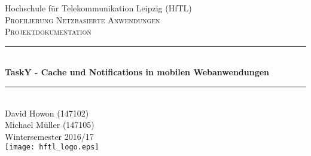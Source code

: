 \begin{titlepage}

\newcommand{\HRule}{\rule{\linewidth}{0.5mm}} %

\center %
 

\LARGE Hochschule für Telekommunikation Leipzig (HfTL)\\[1.2cm] %
\textsc{\Large Profilierung Netzbasierte Anwendungen}\\[0.5cm] %
\textsc{\large Projektdokumentation}\\[0.5cm] %


\HRule \\[0.4cm]
{ \LARGE \bfseries TaskY - Cache und Notifications in mobilen Webanwendungen}\\ %
\HRule \\[1cm]
 

\Large David Howon (147102)\\[1cm] 

\Large Michael Müller (147105)\\[1cm] 


{\large Wintersemester 2016/17}\\[2cm] %


\texttt{[image: hftl\_logo.eps]}\\[1cm] %
 

\vfill %

\end{titlepage}
